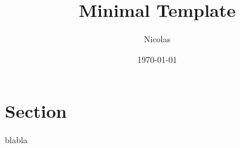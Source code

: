 \documentclass{article}
\title{Minimal Template}
\author{Nicolas}
\date{\today}
\begin{document}
\maketitle

\section{Section}

blabla



\end{document}
